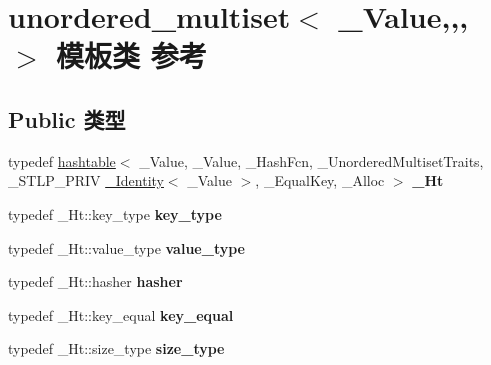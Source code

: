 \hypertarget{classunordered__multiset}{}\section{unordered\+\_\+multiset$<$ \+\_\+\+Value,,, $>$ 模板类 参考}
\label{classunordered__multiset}
\subsection*{Public 类型}
\begin{DoxyCompactItemize}
\item 
\mbox{\label{classunordered__multiset_a303bb52105f74f12ee68166416782c21}} 
typedef \hyperlink{classhashtable}{hashtable}$<$ \+\_\+\+Value, \+\_\+\+Value, \+\_\+\+Hash\+Fcn, \+\_\+\+Unordered\+Multiset\+Traits, \+\_\+\+S\+T\+L\+P\+\_\+\+P\+R\+IV \hyperlink{struct___identity}{\+\_\+\+Identity}$<$ \+\_\+\+Value $>$, \+\_\+\+Equal\+Key, \+\_\+\+Alloc $>$ {\bfseries \+\_\+\+Ht}
\item 
\mbox{\label{classunordered__multiset_ae18685967ff061c0d78bade856eb1f59}} 
typedef \+\_\+\+Ht\+::key\+\_\+type {\bfseries key\+\_\+type}
\item 
\mbox{\label{classunordered__multiset_a2eadcfb3df0933d5da78406f11efee30}} 
typedef \+\_\+\+Ht\+::value\+\_\+type {\bfseries value\+\_\+type}
\item 
\mbox{\label{classunordered__multiset_aff124efe0dfbe4fb27a515f057bc4714}} 
typedef \+\_\+\+Ht\+::hasher {\bfseries hasher}
\item 
\mbox{\label{classunordered__multiset_a4759da31d3b12d5c494b817b15081d7a}} 
typedef \+\_\+\+Ht\+::key\+\_\+equal {\bfseries key\+\_\+equal}
\item 
\mbox{\label{classunordered__multiset_ae35f8589551ad0f50e9c5c79064674ba}} 
typedef \+\_\+\+Ht\+::size\+\_\+type {\bfseries size\+\_\+type}
\item 
\mbox{\label{classunordered__multiset_ab31c9e38e98c70c280761275ed600ef4}} 

\end{DoxyCompactItemize}
